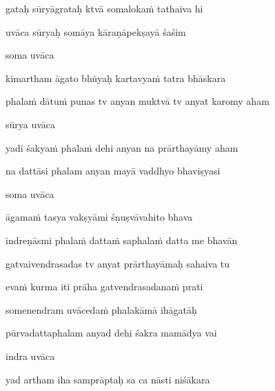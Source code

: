 gataḥ sūryāgrataḥ ktvā somaloka\.m tathaiva hi\thinspace{\danda} \dontdisplaylinenum

uvāca sūryaḥ somāya kāraṇāpekṣayā śaśim \veg\dontdisplaylinenum

soma uvāca~{\dandab}\dontdisplaylinenum 

kimartham āgato bhūyaḥ kartavya\.m tatra bhāskara\thinspace{\danda} \dontdisplaylinenum

phala\.m dātu\.m punas tv anyan muktvā tv anyat karomy aham \veg\dontdisplaylinenum

sūrya uvāca~{\dandab}\dontdisplaylinenum 

yadi śakya\.m phala\.m dehi anyan na prārthayāmy aham\thinspace{\danda} \dontdisplaylinenum

na dattāsi phalam anyan mayā vaddhyo bhaviṣyasi \veg\dontdisplaylinenum

soma uvāca~{\dandab}\dontdisplaylinenum 

āgama\.m tasya vakṣyāmi śṇuṣvāvahito bhava\thinspace{\danda} \dontdisplaylinenum

indreṇāsmi phala\.m datta\.m saphala\.m datta me bhavān \veg\dontdisplaylinenum

gatvaivendrasadas tv anyat prārthayāmaḥ sahaiva tu\thinspace{\dandab} \dontdisplaylinenum

eva\.m kurma iti prāha gatvendrasadana\.m prati \veg\dontdisplaylinenum

somenendram uvāceda\.m phalakāmā ihāgatāḥ\thinspace{\dandab} \dontdisplaylinenum

pūrvadattaphalam anyad dehi śakra mamādya vai \veg\dontdisplaylinenum

indra uvāca~{\dandab}\dontdisplaylinenum 

yad artham iha samprāptaḥ sa ca nāsti niśākara\thinspace{\danda} \dontdisplaylinenum

